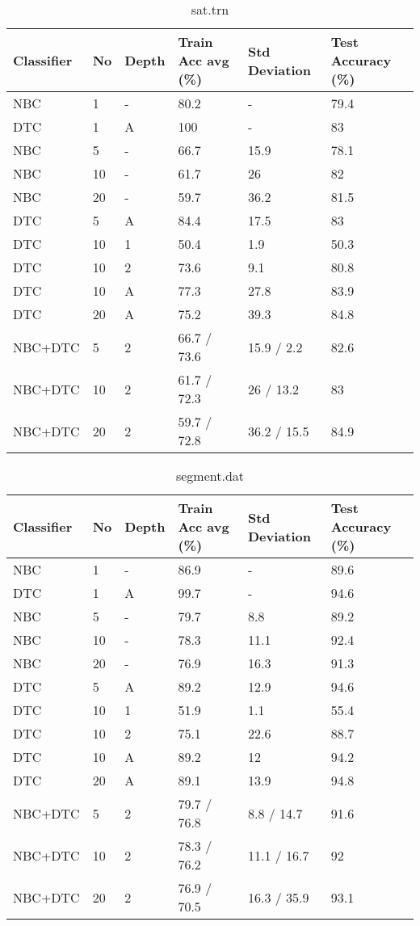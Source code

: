 \begin{table}[h]
	\centering
	\begin{tabular}[h]{l|l|l|l|l|l}
		Classifier & No & Depth & Train Acc avg (\%) & Std Deviation & Test Accuracy (\%)\\
		\hline
		NBC & 1 & - & 80.2 & - & 79.4 \\
		DTC & 1 & A & 100 & - & 83 \\
		NBC & 5 & - & 66.7 & 15.9 & 78.1 \\
		NBC & 10 & - & 61.7 & 26 & 82 \\
		NBC & 20 & - & 59.7 & 36.2 & 81.5 \\
		DTC & 5 & A & 84.4 & 17.5 & 83 \\
		DTC & 10 & 1 & 50.4 & 1.9 & 50.3 \\
		DTC & 10 & 2 & 73.6 & 9.1 & 80.8 \\
		DTC & 10 & A & 77.3 & 27.8 & 83.9 \\
		DTC & 20 & A & 75.2 & 39.3 & 84.8 \\
		NBC+DTC & 5 & 2 & 66.7 / 73.6 & 15.9 / 2.2 & 82.6 \\
		NBC+DTC & 10 & 2 & 61.7 / 72.3 & 26 / 13.2 & 83 \\
		NBC+DTC & 20 & 2 & 59.7 / 72.8 & 36.2 / 15.5 & 84.9 \\
	\end{tabular}
	\caption{sat.trn}
\end{table}

\begin{table}[h]
	\centering
	\begin{tabular}[h]{l|l|l|l|l|l}
		Classifier & No & Depth & Train Acc avg (\%) & Std Deviation & Test Accuracy (\%)\\
		\hline
		NBC & 1 & -  & 86.9 & - & 89.6 \\
		DTC & 1 & A  & 99.7 & - & 94.6 \\
		NBC & 5 & -  & 79.7 & 8.8 & 89.2 \\
		NBC & 10 & -  & 78.3 & 11.1 & 92.4 \\
		NBC & 20 & -  & 76.9 & 16.3 & 91.3 \\
		DTC & 5 &  A & 89.2 & 12.9 & 94.6 \\
		DTC & 10 & 1  & 51.9 & 1.1 & 55.4 \\
		DTC & 10 & 2  & 75.1 & 22.6 & 88.7 \\
		DTC & 10 &  A & 89.2 & 12 & 94.2 \\
		DTC & 20 &  A & 89.1 & 13.9 & 94.8 \\
		NBC+DTC & 5 & 2  & 79.7 / 76.8 & 8.8 / 14.7 & 91.6 \\
		NBC+DTC & 10 & 2  & 78.3 / 76.2 & 11.1 / 16.7 & 92 \\
		NBC+DTC & 20 & 2  & 76.9 / 70.5 & 16.3 / 35.9 & 93.1 \\
	\end{tabular}
	\caption{segment.dat}
\end{table}

